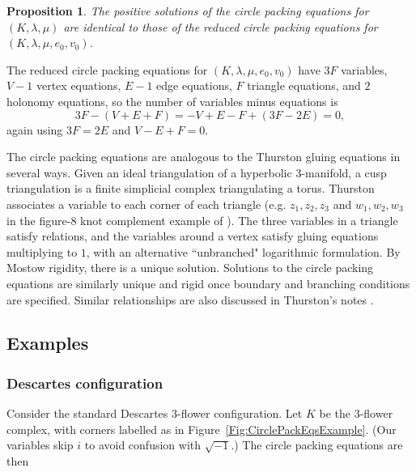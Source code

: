 \documentclass[12pt]{amsart}
\numberwithin{equation}{section}
\newtheorem{proposition}[equation]{Proposition}
\theoremstyle{named}
\newcommand{\reffig}[1]{Figure~\ref{Fig:#1}}
\begin{document}
\begin{proposition}
\label{Prop:circle_packing_reduction_torus}
The positive solutions of the circle packing equations for $(K, \lambda, \mu)$ are identical to those of the reduced circle packing equations for $(K, \lambda, \mu, e_0, v_0)$.
\end{proposition}

The reduced circle packing equations for $(K, \lambda, \mu, e_0, v_0)$ have $3F$ variables, $V-1$ vertex equations, $E-1$ edge equations, $F$ triangle equations, and $2$ holonomy equations, so the number of variables minus equations is
\[
3F - (V+E+F) 
= -V+E-F + (3F-2E) = 0,
\]
again using $3F=2E$ and $V-E+F=0$.

The circle packing equations are analogous to the Thurston gluing equations in several ways. Given an ideal triangulation of a hyperbolic 3-manifold, a cusp triangulation is a finite simplicial complex triangulating a torus. Thurston associates a variable to each corner of each triangle (e.g. $z_1, z_2, z_3$ and $w_1, w_2, w_3$ in the figure-8 knot complement example of \cite[ch. 4]{Thurston_notes}). The three variables in a triangle satisfy relations, and the variables around a vertex satisfy gluing equations multiplying to $1$, with an alternative ``unbranched" logarithmic formulation. By Mostow rigidity, there is a unique solution. Solutions to the circle packing equations are similarly unique and rigid once boundary and branching conditions are specified. Similar relationships are also discussed in Thurston's notes \cite[ch. 13]{Thurston_notes}.

\subsection{Examples}

\subsubsection{Descartes configuration}

Consider the standard Descartes 3-flower configuration. Let $K$ be the 3-flower complex, with corners labelled as in \reffig{CirclePackEqsExample}. (Our variables skip $i$ to avoid confusion with $\sqrt{-1}$.)
The circle packing equations are then
\end{document}
